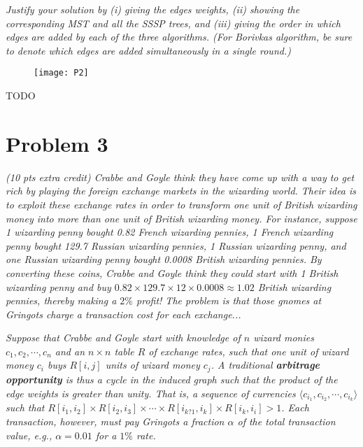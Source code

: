 \documentclass[12pt]{article} \setlength{\oddsidemargin}{0in}
\begin{document}
\textit{Justify your solution by (i) giving the edges weights, (ii) showing the corresponding
MST and all the SSSP trees, and (iii) giving the order in which edges are added by
each of the three algorithms. (For Borivkas algorithm, be sure to denote which edges
are added simultaneously in a single round.)}

\begin{figure}[h]
  \centering \texttt{[image: P2]}
\end{figure}


TODO

\newpage

\section*{Problem 3}

\textit{(10 pts extra credit) Crabbe and Goyle think they have come up with a way to get
rich by playing the foreign exchange markets in the wizarding world. Their idea is
to exploit these exchange rates in order to transform one unit of British wizarding
money into more than one unit of British wizarding money. For instance, suppose
1 wizarding penny bought 0.82 French wizarding pennies, 1 French wizarding penny
bought 129.7 Russian wizarding pennies, 1 Russian wizarding penny, and one Russian
wizarding penny bought 0.0008 British wizarding pennies. By converting these coins,
Crabbe and Goyle think they could start with 1 British wizarding penny and buy
$0.82 \times 129.7 \times 12 \times 0.0008 \approx 1.02$ British wizarding pennies, thereby making a $2\%$
profit! The problem is that those gnomes at Gringots charge a transaction cost for
each exchange...}

\textit{Suppose that Crabbe and Goyle start with knowledge of $n$ wizard monies $c_1, c_2, \cdots, c_n$
and an $n \times n$ table $R$ of exchange rates, such that one unit of wizard money $c_i$ buys
$R[i, j]$ units of wizard money $c_j$. A traditional \textbf{arbitrage opportunity} is thus a cycle
in the induced graph such that the product of the edge weights is greater than unity.
That is, a sequence of currencies $\langle c_{i_{1}}, c_{i_{2}} , \cdots , c_{i_{k}} \rangle$ such that $R[i_1, i_2] \times R[i_2, i_3] \times \cdots \times R[i_{k?1}, i_k] \times R[i_k, i_i] > 1$. Each transaction, however, must pay Gringots a fraction $\alpha$ of the total transaction value, e.g., $\alpha = 0.01$ for a $1\%$ rate.}
\end{document}
